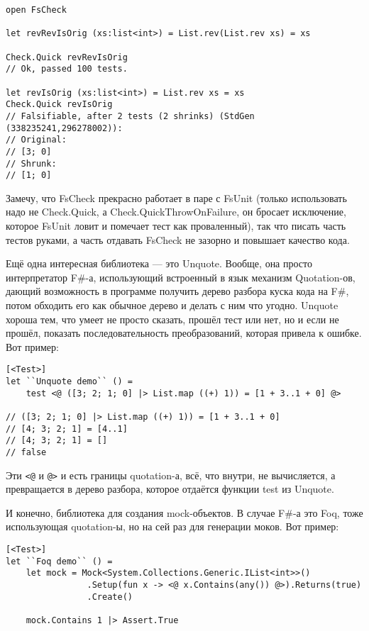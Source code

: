 \documentclass{../../text-style}
\begin{document}
\begin{verbatim}
open FsCheck

let revRevIsOrig (xs:list<int>) = List.rev(List.rev xs) = xs

Check.Quick revRevIsOrig
// Ok, passed 100 tests.

let revIsOrig (xs:list<int>) = List.rev xs = xs
Check.Quick revIsOrig
// Falsifiable, after 2 tests (2 shrinks) (StdGen (338235241,296278002)):
// Original:
// [3; 0]
// Shrunk:
// [1; 0]
\end{verbatim}

Замечу, что FsCheck прекрасно работает в паре с FsUnit (только использовать надо не Check.Quick, а Check.QuickThrowOnFailure, он бросает исключение, которое FsUnit ловит и помечает тест как проваленный), так что писать часть тестов руками, а часть отдавать FsCheck не зазорно и повышает качество кода.

Ещё одна интересная библиотека --- это Unquote. Вообще, она просто интерпретатор F\#-а, использующий встроенный в язык механизм Quotation-ов, дающий возможность в программе получить дерево разбора куска кода на F\#, потом обходить его как обычное дерево и делать с ним что угодно. Unquote хороша тем, что умеет не просто сказать, прошёл тест или нет, но и если не прошёл, показать последовательность преобразований, которая привела к ошибке. Вот пример:

\begin{verbatim}
[<Test>]
let ``Unquote demo`` () =
    test <@ ([3; 2; 1; 0] |> List.map ((+) 1)) = [1 + 3..1 + 0] @>

// ([3; 2; 1; 0] |> List.map ((+) 1)) = [1 + 3..1 + 0]
// [4; 3; 2; 1] = [4..1]
// [4; 3; 2; 1] = []
// false
\end{verbatim}

Эти \verb|<@| и \verb|@>| и есть границы quotation-а, всё, что внутри, не вычисляется, а превращается в дерево разбора, которое отдаётся функции test из Unquote.

И конечно, библиотека для создания mock-объектов. В случае F\#-а это Foq, тоже использующая quotation-ы, но на сей раз для генерации моков. Вот пример:

\begin{verbatim}
[<Test>]
let ``Foq demo`` () =
    let mock = Mock<System.Collections.Generic.IList<int>>()
                .Setup(fun x -> <@ x.Contains(any()) @>).Returns(true)
                .Create()

    mock.Contains 1 |> Assert.True
\end{verbatim}
\end{document}
